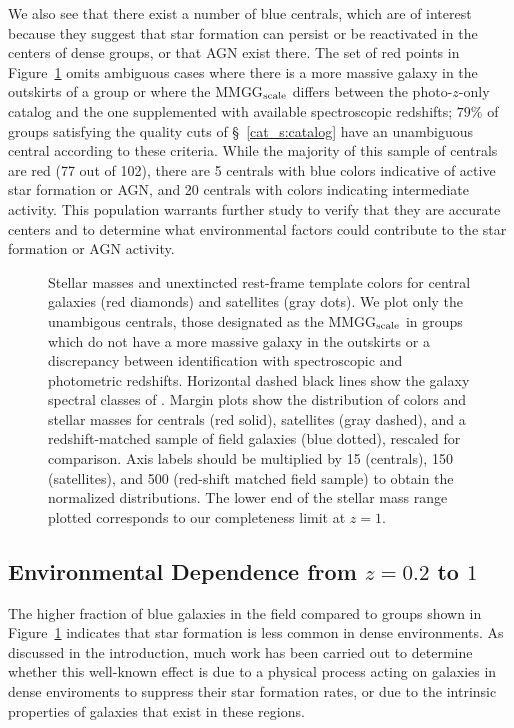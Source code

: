 We also see that there exist a number of blue centrals, which are of
interest because they suggest that star formation can persist or be
reactivated in the centers of dense groups, or that AGN exist there. The set of red
points in Figure~\ref{cat_fig:group_cm} omits ambiguous cases where there
is a more massive galaxy in the outskirts of a group or where the
MMGG$_{\rm scale}$ differs between the photo-$z$-only catalog and
the one supplemented with available spectroscopic redshifts; $79\%$ of
groups satisfying the quality cuts of \S~\ref{cat_s:catalog} have an
unambiguous central according to these criteria. While the majority of
this sample of centrals are red (77 out of 102), there are 5 centrals
with blue colors indicative of active star formation or AGN, and 20 centrals
with colors indicating intermediate activity. This population warrants
further study to verify that they are accurate centers and to
determine what environmental factors could contribute to the star
formation or AGN activity.

\begin{figure}
\caption{Stellar masses and unextincted rest-frame template colors for
  central galaxies (red diamonds) and satellites (gray dots). We plot
  only the unambigous centrals, \ie those 
  designated as the MMGG$_{\rm scale}$ in groups which do not have a more
  massive galaxy in the outskirts or a discrepancy between
  identification with spectroscopic and photometric redshifts. Horizontal 
  dashed black lines show the galaxy spectral classes of
  \citet{Ilbert2010}. Margin plots show the distribution of colors and
stellar masses for centrals (red solid), satellites (gray dashed), and
a redshift-matched sample of field galaxies (blue dotted), rescaled
for comparison. Axis labels should be multiplied by 15 (centrals), 150
(satellites), and 500 (red-shift matched field sample)
to obtain the normalized distributions. The lower end of the stellar
mass range plotted corresponds to our completeness limit at $z=1$.}
\label{cat_fig:group_cm}
\end{figure}
 
\subsection{Environmental Dependence from $z=0.2$ to $1$}

The higher fraction of blue galaxies in the field compared to groups
shown in Figure~\ref{cat_fig:group_cm}
indicates that star formation is less common in dense
environments. As discussed in the introduction, much work has been
carried out to determine whether this well-known effect is due to a physical
process acting on galaxies in dense enviroments to suppress their star
formation rates, or due to the intrinsic properties of galaxies that
exist in these regions. 

